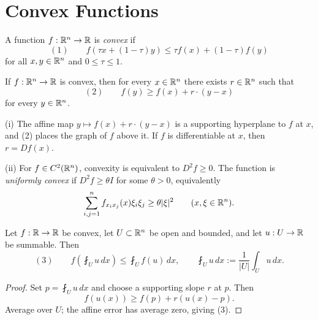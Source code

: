 
\section{Convex Functions}
\label{sec:convex-functions}

\begin{definition}
\label{def:convex-function-rn}
A function $f:\mathbb{R}^n\to\mathbb{R}$ is \textit{convex} if
\[
(1)\qquad
f(\tau x+(1-\tau)y)
\leq \tau f(x)+(1-\tau)f(y)
\]
for all $x,y\in\mathbb{R}^n$ and $0\leq\tau\leq1$.
\end{definition}

\begin{theorem}
\label{thm:supporting-hyperplanes}

If $f:\mathbb{R}^n\to\mathbb{R}$ is convex, then for every $x\in\mathbb{R}^n$ there exists $r\in\mathbb{R}^n$ such that
\[
(2)\qquad f(y)\geq f(x)+r\cdot(y-x)
\]
for every $y\in\mathbb{R}^n$.
\end{theorem}

\begin{remark}
\label{rem:supporting-hyperplane-remarks}

(i) The affine map $y\mapsto f(x)+r\cdot(y-x)$ is a supporting hyperplane to $f$ at $x$, and (2) places the graph of $f$ above it. If $f$ is differentiable at $x$, then $r=Df(x)$.

(ii) For $f\in C^2(\mathbb{R}^n)$, convexity is equivalent to $D^2f\geq0$. The function is \textit{uniformly convex} if $D^2f\geq\theta I$ for some $\theta>0$, equivalently
\[
\sum_{i,j=1}^n f_{x_ix_j}(x)\xi_i\xi_j
\geq\theta|\xi|^2
\qquad(x,\xi\in\mathbb{R}^n).
\]
\end{remark}

\begin{theorem}
\label{thm:jensens-inequality}

Let $f:\mathbb{R}\to\mathbb{R}$ be convex, let $U\subset\mathbb{R}^n$ be open and bounded, and let $u:U\to\mathbb{R}$ be summable. Then
\[
(3)\qquad
f\left(\fint_Uu\,dx\right)
\leq\fint_Uf(u)\,dx,
\qquad
\fint_Uu\,dx:=\frac1{|U|}\int_Uu\,dx.
\]
\end{theorem}
\begin{proof}
\sketch Set $p=\fint_Uu\,dx$ and choose a supporting slope $r$ at $p$. Then
\[
f(u(x))\geq f(p)+r(u(x)-p).
\]
Average over $U$; the affine error has average zero, giving (3).
\end{proof}

